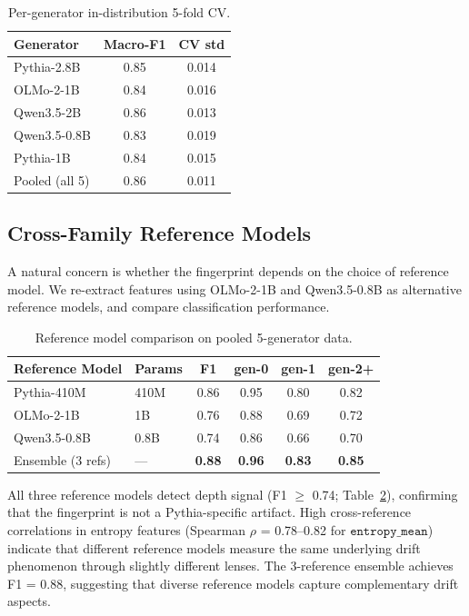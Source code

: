 \documentclass[letterpaper, 10pt]{article}
\begin{document}
\begin{table}[t]
\centering
\caption{Per-generator in-distribution 5-fold CV.}
\label{tab:indist}
\small
\begin{tabular}{@{}lcc@{}}
\toprule
Generator & Macro-F1 & CV std \\
\midrule
Pythia-2.8B & 0.85 & 0.014 \\
OLMo-2-1B & 0.84 & 0.016 \\
Qwen3.5-2B & 0.86 & 0.013 \\
Qwen3.5-0.8B & 0.83 & 0.019 \\
Pythia-1B & 0.84 & 0.015 \\
\midrule
Pooled (all 5) & 0.86 & 0.011 \\
\bottomrule
\end{tabular}
\end{table}

\subsection{Cross-Family Reference Models}

A natural concern is whether the fingerprint depends on the choice of reference model.
We re-extract features using OLMo-2-1B and Qwen3.5-0.8B as alternative reference models, and compare classification performance.

\begin{table}[t]
\centering
\caption{Reference model comparison on pooled 5-generator data.}
\label{tab:crossref}
\small
\begin{tabular}{@{}llcccc@{}}
\toprule
Reference Model & Params & F1 & gen-0 & gen-1 & gen-2+ \\
\midrule
Pythia-410M & 410M & 0.86 & 0.95 & 0.80 & 0.82 \\
OLMo-2-1B & 1B & 0.76 & 0.88 & 0.69 & 0.72 \\
Qwen3.5-0.8B & 0.8B & 0.74 & 0.86 & 0.66 & 0.70 \\
Ensemble (3 refs) & --- & \textbf{0.88} & \textbf{0.96} & \textbf{0.83} & \textbf{0.85} \\
\bottomrule
\end{tabular}
\end{table}

All three reference models detect depth signal (F1 $\geq$ 0.74; Table~\ref{tab:crossref}), confirming that the fingerprint is not a Pythia-specific artifact.
High cross-reference correlations in entropy features (Spearman $\rho$ = 0.78--0.82 for $\texttt{entropy\_mean}$) indicate that different reference models measure the same underlying drift phenomenon through slightly different lenses.
The 3-reference ensemble achieves F1 = 0.88, suggesting that diverse reference models capture complementary drift aspects.
\end{document}
